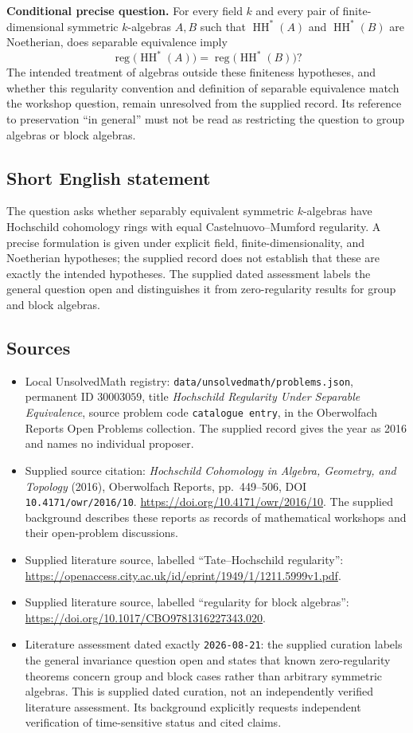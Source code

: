 \documentclass[11pt]{article}
\begin{document}
\textbf{Conditional precise question.} For every field \(k\) and every pair of finite-dimensional symmetric \(k\)-algebras \(A,B\) such that \(\operatorname{HH}^*(A)\) and \(\operatorname{HH}^*(B)\) are Noetherian, does separable equivalence imply
\[
\operatorname{reg}\bigl(\operatorname{HH}^*(A)\bigr)
=
\operatorname{reg}\bigl(\operatorname{HH}^*(B)\bigr)?
\]
The intended treatment of algebras outside these finiteness hypotheses, and whether this regularity convention and definition of separable equivalence match the workshop question, remain unresolved from the supplied record. Its reference to preservation ``in general'' must not be read as restricting the question to group algebras or block algebras.
\subsection{Short English statement}
The question asks whether separably equivalent symmetric \(k\)-algebras have Hochschild cohomology rings with equal Castelnuovo--Mumford regularity. A precise formulation is given under explicit field, finite-dimensionality, and Noetherian hypotheses; the supplied record does not establish that these are exactly the intended hypotheses. The supplied dated assessment labels the general question open and distinguishes it from zero-regularity results for group and block algebras.
\subsection{Sources}
\begin{itemize}
\item Local UnsolvedMath registry: \texttt{data/unsolvedmath/problems.json}, permanent ID \(30003059\), title \emph{Hochschild Regularity Under Separable Equivalence}, source problem code \texttt{catalogue entry}, in the Oberwolfach Reports Open Problems collection. The supplied record gives the year as 2016 and names no individual proposer.
\item Supplied source citation: \emph{Hochschild Cohomology in Algebra, Geometry, and Topology} (2016), Oberwolfach Reports, pp.~449--506, DOI \texttt{10.4171/owr/2016/10}. \url{https://doi.org/10.4171/owr/2016/10}. The supplied background describes these reports as records of mathematical workshops and their open-problem discussions.
\item Supplied literature source, labelled ``Tate--Hochschild regularity'': \url{https://openaccess.city.ac.uk/id/eprint/1949/1/1211.5999v1.pdf}.
\item Supplied literature source, labelled ``regularity for block algebras'': \url{https://doi.org/10.1017/CBO9781316227343.020}.
\item Literature assessment dated exactly \texttt{2026-08-21}: the supplied curation labels the general invariance question open and states that known zero-regularity theorems concern group and block cases rather than arbitrary symmetric algebras. This is supplied dated curation, not an independently verified literature assessment. Its background explicitly requests independent verification of time-sensitive status and cited claims.
\end{itemize}
\end{document}
